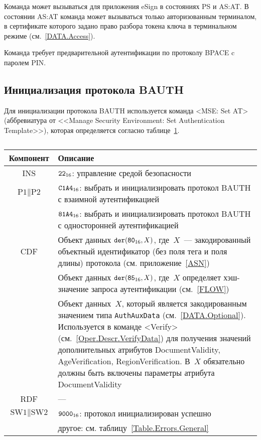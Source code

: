 Команда может вызываться для приложения eSign в 
состояниях PS и AS:AT. В состоянии AS:AT команда 
может вызываться только авторизованным терминалом,
в сертификате которого задано право 
разбора токена ключа в терминальном режиме (см.~\ref{DATA.Access}).

Команда требует предварительной аутентификации по 
протоколу BPACE c паролем PIN. 


\subsection{Инициализация протокола BAUTH}
\label{Oper.Descr.SetBAUTH}

Для инициализации протокола BAUTH используется
команда <MSE: Set AT> 
(аббревиатура от <<Manage Security Environment: Set 
Authentication Template>>), 
которая определяется согласно 
таблице~\ref{Table.Oper.SetBAUTHCmd}.

\begin{table}[hbt]
\caption{}\label{Table.Oper.SetBAUTHCmd}
\begin{tabular}{|c|p{14cm}|}
\hline
Компонент & Описание \\
\hline
\hline
INS & $\texttt{22}_{16}$: управление средой безопасности\\ 
\hline
$\text{P1} \parallel\text{P2}$ & $\texttt{C1A4}_{16}$: выбрать и 
инициализировать протокол BAUTH с взаимной 
аутентификацией\\ 
 & $\texttt{81A4}_{16}$: выбрать и инициализировать протокол BAUTH с 
односторонней аутентификацией\\
\hline
CDF & Объект данных 
$\texttt{der}(\texttt{80}_{16}, X)$, где~$X$~--- 
закодированный объектный идентификатор (без поля тега и поля 
длины) протокола (см. приложение~\ref{ASN})\\
 & Объект данных $\texttt{der}(\texttt{85}_{16}, X)$, 
где~$X$ определяет хэш-значение запроса аутентификации (см.~\ref{FLOW})\\
 & Объект данных~$X$, который является 
закодированным значением типа \verb|AuthAuxData| (см.~\ref{DATA.Optional}). 
Используется в команде <Verify> (см.~\ref{Oper.Descr.VerifyData}) 
для получения значений дополнительных атрибутов DocumentValidity, 
AgeVerification, RegionVerification. В~$X$ 
обязательно должны быть включены параметры атрибута DocumentValidity\\
\hline 
RDF &  --- \\
\hline
$\text{SW1} \parallel \text{SW2}$ & 
$\texttt{9000}_{16}$: протокол инициализирован успешно \\
  & другое: см. таблицу~\ref{Table.Errors.General}\\
\hline
\end{tabular}
\end{table}

